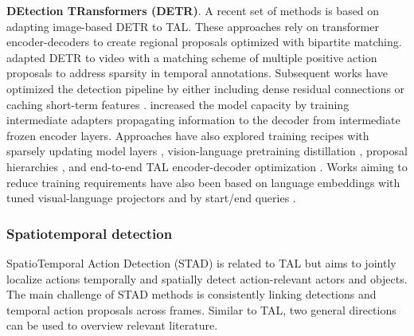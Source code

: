 \noindent
\textbf{DEtection TRansformers (DETR)}. A recent set of methods is based on adapting image-based DETR  to TAL. These approaches rely on transformer encoder-decoders to create regional proposals optimized with bipartite matching.  adapted DETR to video with a matching scheme of multiple positive action proposals to address sparsity in temporal annotations. Subsequent works have optimized the detection pipeline by either including dense residual connections  or caching short-term features . 
 increased the model capacity by training intermediate adapters propagating information to the decoder from intermediate frozen encoder layers. Approaches have also explored training recipes with sparsely updating model layers , vision-language pretraining distillation , proposal hierarchies ,
and end-to-end TAL encoder-decoder optimization . Works aiming to reduce training requirements have also been based on language embeddings with tuned visual-language projectors  and by start/end queries .



\subsubsection{Spatiotemporal detection} 
\label{sec:recognition::temporal:::detection}

SpatioTemporal Action Detection (STAD) is related to TAL but aims to jointly localize actions temporally and spatially detect action-relevant actors and objects. The main challenge of STAD methods is consistently linking detections and temporal action proposals across frames. Similar to TAL, two general directions can be used to overview relevant literature. 


